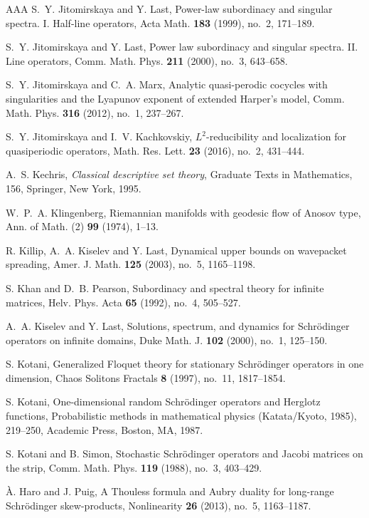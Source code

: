 \documentclass[11pt]{amsart}
\theoremstyle{remark}
\theoremstyle{definition}
\begin{document}
\begin{thebibliography}{AAA}
S.~Y. Jitomirskaya and Y. Last, Power-law subordinacy and singular spectra. I. Half-line operators, Acta Math. {\bf 183} (1999), no.~2, 171--189.


S.~Y. Jitomirskaya and Y. Last, Power law subordinacy and singular spectra. II. Line operators, Comm. Math. Phys. {\bf 211} (2000), no.~3, 643--658.

S.~Y. Jitomirskaya and C.~A. Marx, Analytic quasi-perodic cocycles with singularities and the Lyapunov exponent of extended Harper's model, Comm. Math. Phys. {\bf 316} (2012), no.~1, 237--267.

S.~Y. Jitomirskaya and I.~V. Kachkovskiy, $L^2$-reducibility and localization for quasiperiodic operators, Math. Res. Lett. {\bf 23} (2016), no.~2, 431--444.


A.~S. Kechris, {\it Classical descriptive set theory}, Graduate Texts in Mathematics, 156, Springer, New York, 1995.

W.~P.~A. Klingenberg, Riemannian manifolds with geodesic flow of Anosov type, Ann. of Math. (2) {\bf 99} (1974), 1--13.

R. Killip, A.~A. Kiselev and Y. Last, Dynamical upper bounds on wavepacket spreading, Amer. J. Math. {\bf 125} (2003), no.~5, 1165--1198.

S. Khan and D.~B. Pearson, Subordinacy and spectral theory for infinite matrices, Helv. Phys. Acta {\bf 65} (1992), no.~4, 505--527.

A.~A. Kiselev and Y. Last, Solutions, spectrum, and dynamics for Schr\"odinger operators on infinite domains, Duke Math. J. {\bf 102} (2000), no.~1, 125--150.

S. Kotani, Generalized Floquet theory for stationary Schr\"odinger operators in one dimension, Chaos Solitons Fractals {\bf 8} (1997), no.~11, 1817--1854.

S. Kotani, One-dimensional random Schr\"odinger operators and Herglotz functions, Probabilistic
methods in mathematical physics (Katata/Kyoto, 1985), 219–250, Academic Press,
Boston, MA, 1987.

S. Kotani and B. Simon, Stochastic Schr\"odinger operators and Jacobi matrices on the strip, Comm. Math. Phys. {\bf 119} (1988), no.~3, 403--429.


\`A. Haro and J. Puig, A Thouless formula and Aubry duality for long-range Schr\"odinger skew-products, Nonlinearity {\bf 26} (2013), no.~5, 1163--1187.


\end{thebibliography}
\end{document}
